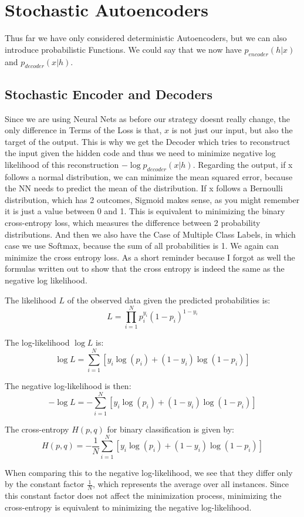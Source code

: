 \documentclass[a4paper]{article}
\begin{document}
\section{Stochastic Autoencoders}
Thus far we have only considered deterministic Autoencoders, but we can also introduce probabilistic Functions. We could say that we now have $p_{encoder}(h|x)$  and $p_{decoder}(x|h)$. 

\subsection{Stochastic Encoder and Decoders}    
Since we are using Neural Nets as before our strategy doesnt really change, the only difference in Terms of the Loss is that, $x$ is not just our input, but also the target of the output. This is why we get the Decoder which tries to reconstruct the input given the hidden code and thus we need to minimize negative log likelihood of this reconstruction $
- \log p_{decoder}(x|h)$. Regarding the output, if x follows a normal distribution, we can minimize the mean squared error, because the NN needs to predict the mean of the distribution. If x follows a Bernoulli distribution, which has 2 outcomes, Sigmoid makes sense, as you might remember it is just a value between 0 and 1. This is equivalent to minimizing the binary cross-entropy loss, which measures the difference between 2 
probability distributions. And then we also have the Case of Multiple Class Labels, in which case we use Softmax, because the sum of all probabilities is 1. We again can minimize the cross entropy loss.  As a short reminder because I forgot as well the formulas written out to show that the cross entropy is indeed the same as the negative log likelihood.

The likelihood \( L \) of the observed data given the predicted probabilities is:
\[
L = \prod_{i=1}^{N} p_i^{y_i} (1 - p_i)^{1 - y_i}
\]

The log-likelihood \( \log L \) is:
\[
\log L = \sum_{i=1}^{N} \left[ y_i \log(p_i) + (1 - y_i) \log(1 - p_i) \right]
\]

The negative log-likelihood is then:
\[
-\log L = -\sum_{i=1}^{N} \left[ y_i \log(p_i) + (1 - y_i) \log(1 - p_i) \right]
\]


The cross-entropy \( H(p, q) \) for binary classification is given by:
\[
H(p, q) = -\frac{1}{N} \sum_{i=1}^{N} \left[ y_i \log(p_i) + (1 - y_i) \log(1 - p_i) \right]
\]

When comparing this to the negative log-likelihood, we see that they differ only by the constant factor \( \frac{1}{N} \), which represents the average over all instances. Since this constant factor does not affect the minimization process, minimizing the cross-entropy is equivalent to minimizing the negative log-likelihood.
\end{document}
